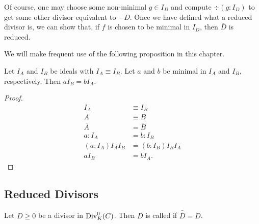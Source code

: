 Of course, one may choose some non-minimal $g \in I_D$ and compute $\div(g : I_D)$ to get some other
divisor equivalent to $-D$.
Once we have defined what a reduced divisor is, we can show that, if $f$ is chosen to be minimal in $I_D$,
then $\bar D$ is reduced.


We will make frequent use of the following proposition in this chapter.

\begin{proposition}
  \label{prop_aI_B_is_bI_A}
  Let $I_A$ and $I_B$ be ideals with $I_A \equiv I_B$.
  Let $a$ and $b$ be minimal in $I_A$ and $I_B$, respectively.
  Then $aI_B = bI_A$.
\end{proposition}
\begin{proof}
  \begin{align*}
    I_A &\equiv I_B \\
    A &\equiv B \\
    \bar A &= \bar B \\
    a : I_A &= b : I_B \\
    (a : I_A)I_AI_B &= (b : I_B)I_BI_A \\
    aI_B &= bI_A.
  \end{align*}
\end{proof}



\subsection{Reduced Divisors}

\begin{definition}
  \label{def_reduced_divisor}
  Let $D \geq 0$ be a divisor in $\operatorname{Div}_K^0(C)$.
  Then $D$ is called  if $\bar{\bar D} = D$.
\end{definition}


